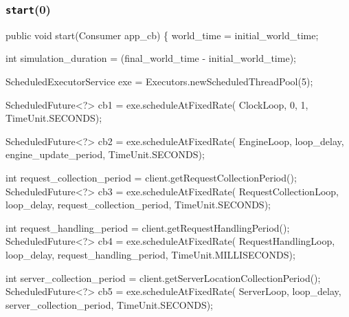 \documentclass{article}
\begin{document}
\subsubsection{{\tt{}\protect{}start}(0)}
\nwenddocs{}\endmoddef{}
public void start(Consumer app_cb) \{
  world_time = initial_world_time;

  int simulation_duration = (final_world_time - initial_world_time);

  ScheduledExecutorService exe = Executors.newScheduledThreadPool(5);

  ScheduledFuture<?> cb1 = exe.scheduleAtFixedRate(
    ClockLoop, 0, 1, TimeUnit.SECONDS);

  ScheduledFuture<?> cb2 = exe.scheduleAtFixedRate(
    EngineLoop, loop_delay, engine_update_period, TimeUnit.SECONDS);

  int request_collection_period = client.getRequestCollectionPeriod();
  ScheduledFuture<?> cb3 = exe.scheduleAtFixedRate(
    RequestCollectionLoop, loop_delay, request_collection_period, TimeUnit.SECONDS);

  int request_handling_period = client.getRequestHandlingPeriod();
  ScheduledFuture<?> cb4 = exe.scheduleAtFixedRate(
    RequestHandlingLoop, loop_delay, request_handling_period, TimeUnit.MILLISECONDS);

  int server_collection_period = client.getServerLocationCollectionPeriod();
  ScheduledFuture<?> cb5 = exe.scheduleAtFixedRate(
    ServerLoop, loop_delay, server_collection_period, TimeUnit.SECONDS);
\end{document}
